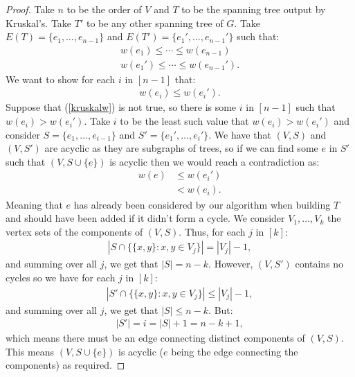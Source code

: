 \begin{proof}
    Take $n$ to be the order of $V$ and $T$ to be the spanning tree
    output by Kruskal's. Take $T'$ to be any other spanning tree of $G$.
    Take $E(T) = \{e_1, \ldots, e_{n - 1}\}$ and $E(T') = \{e_1', \ldots, e_{n - 1}'\}$
    such that: \begin{gather*}
        w(e_1) \leq \cdots \leq w(e_{n - 1}) \\
        w(e_1') \leq \cdots \leq w(e_{n - 1}').
    \end{gather*} We want to show for each $i$ in $[n - 1]$ that: 
    \begin{gather} \label{kruskalw}
        w(e_i) \leq w(e_i').
    \end{gather}
    Suppose that (\ref{kruskalw}) is not true, so there is some $i$ in $[n - 1]$ such
    that $w(e_i) > w(e_i')$. Take $i$ to be the least such value that $w(e_i) > w(e_i')$
    and consider $S = \{e_1, \ldots, e_{i - 1}\}$ and $S' = \{e_1', \ldots, e_i'\}$.
    We have that $(V, S)$ and $(V, S')$ are acyclic as they are subgraphs of trees,
    so if we can find some $e$ in $S'$ such that $(V, S \cup \{e\})$ is acyclic
    then we would reach a contradiction as: \begin{align*}
        w(e) &\leq w(e_i') \tag{as $e$ is already in $S'$} \\
        &< w(e_i).
    \end{align*} Meaning that $e$ has already been considered by our algorithm
    when building $T$ and should have been added if it didn't form a cycle.
    \newpage
    We consider $V_1, \ldots, V_k$ the vertex sets of the components of $(V, S)$.
    Thus, for each $j$ in $[k]$: \begin{gather*}
        |S \cap \{\{x, y\} : x, y \in V_j\}| = |V_j| - 1,
    \end{gather*} and summing over all $j$, we get that $|S| = n - k$.
    However, $(V, S')$ contains no cycles so we have for each $j$ in $[k]$: 
    \begin{gather*}
        |S' \cap \{\{x, y\} : x, y \in V_j\}| \leq |V_j| - 1,
    \end{gather*} and summing over all $j$, we get that $|S| \leq n - k$.
    But: \begin{gather*}
        |S'| = i = |S| + 1 = n - k + 1,
    \end{gather*} which means there must be an edge
    connecting distinct components of $(V, S)$. This means $(V, S \cup \{e\})$
    is acyclic ($e$ being the edge connecting the components) as required.
\end{proof}